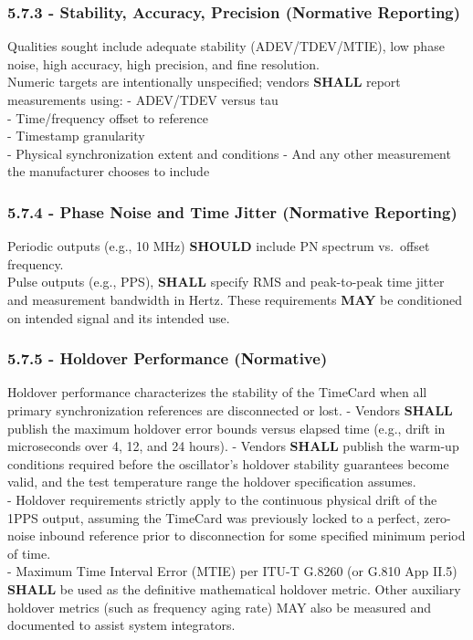 \subsubsection{5.7.3 - Stability, Accuracy, Precision (Normative
Reporting)}\label{stability-accuracy-precision-normative-reporting}

Qualities sought include adequate stability (ADEV/TDEV/MTIE), low phase
noise, high accuracy, high precision, and fine resolution.\\
Numeric targets are intentionally unspecified; vendors \textbf{SHALL}
report measurements using: - ADEV/TDEV versus tau\\
- Time/frequency offset to reference\\
- Timestamp granularity\\
- Physical synchronization extent and conditions - And any other
measurement the manufacturer chooses to include

\subsubsection{5.7.4 - Phase Noise and Time Jitter (Normative
Reporting)}\label{phase-noise-and-time-jitter-normative-reporting}

Periodic outputs (e.g., 10 MHz) \textbf{SHOULD} include PN spectrum
vs.~offset frequency.\\
Pulse outputs (e.g., PPS), \textbf{SHALL} specify RMS and peak-to-peak
time jitter and measurement bandwidth in Hertz. These requirements
\textbf{MAY} be conditioned on intended signal and its intended use.

\subsubsection{5.7.5 - Holdover Performance
(Normative)}\label{holdover-performance-normative}

Holdover performance characterizes the stability of the TimeCard when
all primary synchronization references are disconnected or lost. -
Vendors \textbf{SHALL} publish the maximum holdover error bounds versus
elapsed time (e.g., drift in microseconds over 4, 12, and 24 hours). -
Vendors \textbf{SHALL} publish the warm-up conditions required before
the oscillator's holdover stability guarantees become valid, and the
test temperature range the holdover specification assumes.\\
- Holdover requirements strictly apply to the continuous physical drift
of the 1PPS output, assuming the TimeCard was previously locked to a
perfect, zero-noise inbound reference prior to disconnection for some
specified minimum period of time.\\
- Maximum Time Interval Error (MTIE) per ITU-T G.8260 (or G.810 App
II.5) \textbf{SHALL} be used as the definitive mathematical holdover
metric. Other auxiliary holdover metrics (such as frequency aging rate)
MAY also be measured and documented to assist system integrators.

